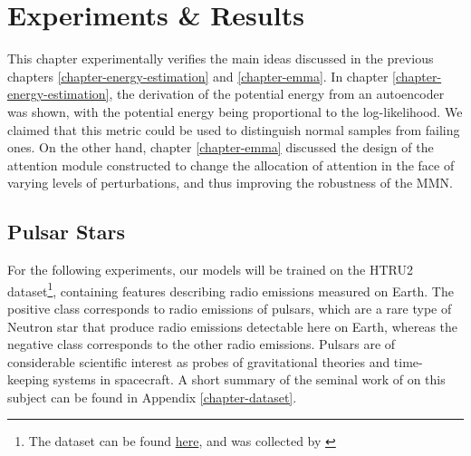 \chapter{Experiments \& Results} 
\label{chapter-experiments} 

This chapter experimentally verifies the main ideas discussed in the previous chapters \ref{chapter-energy-estimation} and \ref{chapter-emma}. In chapter \ref{chapter-energy-estimation}, the derivation of the potential energy from an autoencoder was shown, with the potential energy being proportional to the log-likelihood. We claimed that this metric could be used to distinguish normal samples from failing ones. On the other hand, chapter \ref{chapter-emma} discussed the design of the attention module constructed to change the allocation of attention in the face of varying levels of perturbations, and thus improving the robustness of the MMN. 


\section{Pulsar Stars}
For the following experiments, our models will be trained on the HTRU2 dataset\footnote{The dataset can be found \href{https://archive.ics.uci.edu/ml/datasets/HTRU2}{here}, and was collected by \citep{HTRU}}, containing features describing radio emissions measured on Earth. The positive class corresponds to radio emissions of pulsars, which are a rare type of Neutron star that produce radio emissions detectable here on Earth, whereas the negative class corresponds to the other radio emissions. Pulsars are of considerable scientific interest as probes of gravitational theories and time-keeping systems in spacecraft. A short summary of the seminal work of \citep{lyon} on this subject can be found in Appendix \ref{chapter-dataset}. 

